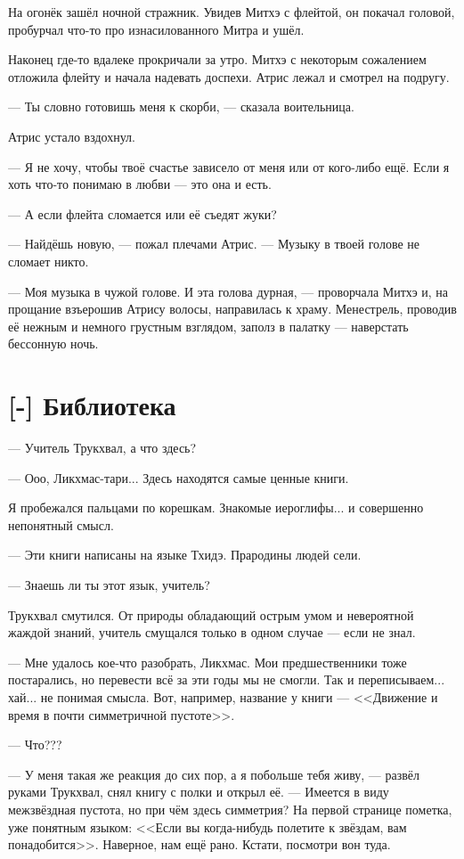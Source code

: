 На огонёк зашёл ночной стражник.
Увидев Митхэ с флейтой, он покачал головой, пробурчал что-то про изнасилованного Митра и ушёл.

Наконец где-то вдалеке прокричали за утро.
Митхэ с некоторым сожалением отложила флейту и начала надевать доспехи.
Атрис лежал и смотрел на подругу.

--- Ты словно готовишь меня к скорби, --- сказала воительница.

Атрис устало вздохнул.

--- Я не хочу, чтобы твоё счастье зависело от меня или от кого-либо ещё.
Если я хоть что-то понимаю в любви --- это она и есть.

--- А если флейта сломается или её съедят жуки?

--- Найдёшь новую, --- пожал плечами Атрис.
--- Музыку в твоей голове не сломает никто.

--- Моя музыка в чужой голове.
И эта голова дурная, --- проворчала Митхэ и, на прощание взъерошив Атрису волосы, направилась к храму.
Менестрель, проводив её нежным и немного грустным взглядом, заполз в палатку --- наверстать бессонную ночь.

\section{[-] Библиотека}

\textspace

--- Учитель Трукхвал, а что здесь?

--- Ооо, Ликхмас-тари...
Здесь находятся самые ценные книги.

Я пробежался пальцами по корешкам.
Знакомые иероглифы... и совершенно непонятный смысл.

--- Эти книги написаны на языке Тхидэ.
Прародины людей сели.

--- Знаешь ли ты этот язык, учитель?

Трукхвал смутился.
От природы обладающий острым умом и невероятной жаждой знаний, учитель смущался только в одном случае --- если не знал.

--- Мне удалось кое-что разобрать, Ликхмас.
Мои предшественники тоже постарались, но перевести всё за эти годы мы не смогли.
Так и переписываем... хай... не понимая смысла.
Вот, например, название у книги --- <<Движение и время в почти симметричной пустоте>>.

--- Что???

--- У меня такая же реакция до сих пор, а я побольше тебя живу, --- развёл руками Трукхвал, снял книгу с полки и открыл её.
--- Имеется в виду межзвёздная пустота, но при чём здесь симметрия?
На первой странице пометка, уже понятным языком: <<Если вы когда-нибудь полетите к звёздам, вам понадобится>>.
Наверное, нам ещё рано.
Кстати, посмотри вон туда.

